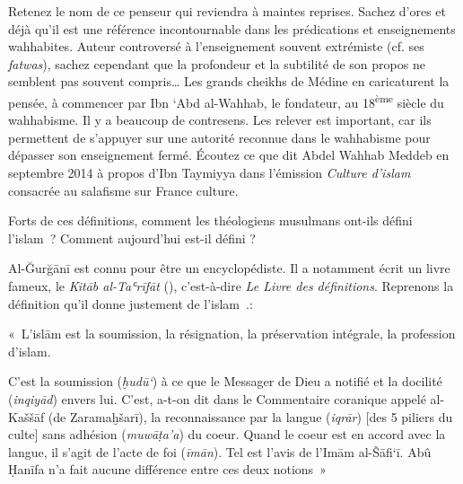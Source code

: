 Retenez le nom de ce penseur qui reviendra à maintes reprises. Sachez
d'ores et déjà qu'il est une référence incontournable dans les
prédications et enseignements wahhabites. Auteur controversé à
l'enseignement souvent extrémiste (cf. ses \emph{fatwas}), sachez
cependant que la profondeur et la subtilité de son propos ne semblent
pas souvent compris\ldots{} Les grands cheikhs de Médine en caricaturent
la pensée, à commencer par Ibn `Abd al-Wahhab, le fondateur, au
18\textsuperscript{ème} siècle du wahhabisme. Il y a beaucoup de
contresens. Les relever est important, car ils permettent de s'appuyer
sur une autorité reconnue dans le wahhabisme pour dépasser son
enseignement fermé.
 Écoutez ce que dit Abdel Wahhab Meddeb en septembre
  2014 à propos d'Ibn Taymiyya dans l'émission \emph{Culture d'islam}
  consacrée au salafisme sur France culture.
\label{sec:wahhabisme}

Forts de ces définitions, comment les théologiens musulmans ont-ils
défini l'islam~? Comment aujourd'hui est-il défini ?



Al-Ğurğānī est connu pour être un encyclopédiste. Il a notamment écrit
un livre fameux, le \emph{Kitāb al-Taʿrīfāt} (),
c'est-à-dire \emph{Le Livre des définitions}. Reprenons la définition
qu'il donne justement de l'islam~.:


\begin{Def}
«~L'islām est la soumission, la résignation, la préservation intégrale,
la profession d'islam.

C'est la soumission (\emph{ḫudū`}) à ce que le Messager de Dieu a
notifié et la docilité (\emph{inqiyād}) envers lui. C'est, a-t-on dit
dans le Commentaire coranique appelé al-Kaššāf (de Zaramaḫšarī), la
reconnaissance par la langue (\emph{iqrār}) {[}des 5 piliers du culte{]}
sans adhésion (\emph{muwāṭa'a}) du coeur. Quand le coeur est en accord
avec la langue, il s'agit de l'acte de foi (\emph{īmān}). Tel est l'avis
de l'Imām al-Šāfi`ī. Abû Ḥanīfa n'a fait aucune différence entre ces
deux notions~»
\end{Def}


